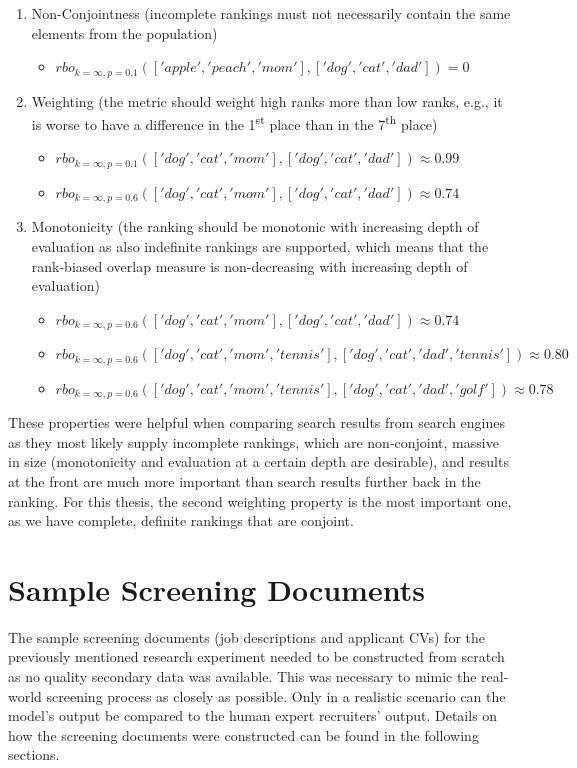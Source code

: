 \documentclass[draft,final]{thesisclass} %
\begin{document}
\begin{enumerate}
\item Non-Conjointness (incomplete rankings must not necessarily contain the same elements from the population)
\begin{itemize}
    \item $rbo_{k=\infty,p=0.1}(['apple','peach','mom'],['dog','cat','dad']) = 0$
\end{itemize}
\item Weighting (the metric should weight high ranks more than low ranks, e.g., it is worse to have a difference in the 1\textsuperscript{st} place than in the 7\textsuperscript{th} place)
\begin{itemize}
    \item $rbo_{k=\infty,p=0.1}(['dog','cat','mom'],['dog','cat','dad']) \approx 0.99$
    \item $rbo_{k=\infty,p=0.6}(['dog','cat','mom'],['dog','cat','dad']) \approx 0.74$
\end{itemize}
\item Monotonicity (the ranking should be monotonic with increasing depth of evaluation as also indefinite rankings are supported, which means that the rank-biased overlap measure is non-decreasing with increasing depth of evaluation)
\begin{itemize}
    \item $rbo_{k=\infty,p=0.6}(['dog','cat','mom'],['dog','cat','dad']) \approx 0.74$
    \item $rbo_{k=\infty,p=0.6}(['dog','cat','mom','tennis'],['dog','cat','dad','tennis']) \approx 0.80$
    \item $rbo_{k=\infty,p=0.6}(['dog','cat','mom','tennis'],['dog','cat','dad','golf']) \approx 0.78$
\end{itemize}
\end{enumerate}
These properties were helpful when comparing search results from search engines as they most likely supply incomplete rankings, which are non-conjoint, massive in size (monotonicity and evaluation at a certain depth are desirable), and results at the front are much more important than search results further back in the ranking.
For this thesis, the second weighting property is the most important one, as we have complete, definite rankings that are conjoint.

\section{Sample Screening Documents} \label{sample_screening_documents}
The sample screening documents (job descriptions and applicant \acs{CV}s) for the previously mentioned research experiment needed to be constructed from scratch as no quality secondary data was available.
This was necessary to mimic the real-world screening process as closely as possible.
Only in a realistic scenario can the model's output be compared to the human expert recruiters' output.
Details on how the screening documents were constructed can be found in the following sections.
\end{document}
